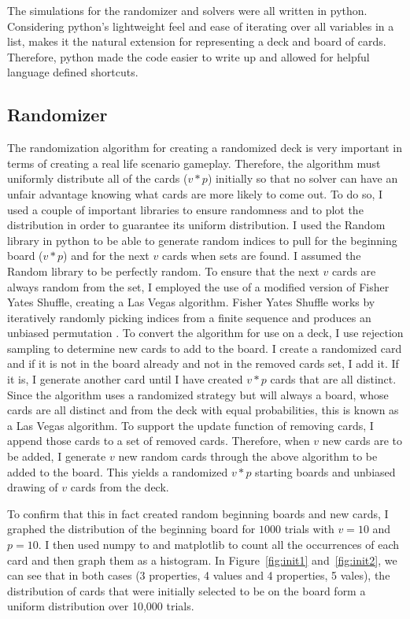\documentclass[pageno]{jpaper}
\begin{document}
The simulations for the randomizer and solvers were all written in python. Considering python's lightweight feel and ease of iterating over all variables in a list, makes it the natural extension for representing a deck and board of cards. Therefore, python made the code easier to write up and allowed for helpful language defined shortcuts. 


\subsection{Randomizer}

The randomization algorithm for creating a randomized deck is very important in terms of creating a real life scenario gameplay. Therefore, the algorithm must uniformly distribute all of the cards ($v*p$) initially so that no solver can have an unfair advantage knowing what cards are more likely to come out. To do so, I used a couple of important libraries to ensure randomness and to plot the distribution in order to guarantee its uniform distribution. I used the Random library in python to be able to generate random indices to pull for the beginning board ($v*p$) and for the next $v$ cards when sets are found. I assumed the Random library to be perfectly random. To ensure that the next $v$ cards are always random from the set, I employed the use of a modified version of Fisher Yates Shuffle, creating a Las Vegas algorithm. Fisher Yates Shuffle works by iteratively randomly picking indices from a finite sequence and produces an unbiased permutation \cite{fisher}. To convert the algorithm for use on a deck, I use rejection sampling to determine new cards to add to the board. I create a randomized card and if it is not in the board already and not in the removed cards set, I add it. If it is, I generate another card until I have created $v*p$ cards that are all distinct. Since the algorithm uses a randomized strategy but will always a board, whose cards are all distinct and from the deck with equal probabilities, this is known as a Las Vegas algorithm. To support the update function of removing cards, I append those cards to a set of removed cards. Therefore, when $v$ new cards are to be added, I generate $v$ new random cards through the above algorithm to be added to the board. This yields a randomized $v*p$ starting boards and unbiased drawing of $v$ cards from the deck.

To confirm that this in fact created random beginning boards and new cards, I graphed the distribution of the beginning board for $1000$ trials with $v = 10$ and $p = 10$. I then used numpy to and matplotlib to count all the occurrences of each card and then graph them as a histogram. In Figure~\ref{fig:init1}  and~\ref{fig:init2}, we can see that in both cases (3 properties, 4 values and 4 properties, 5 vales), the distribution of cards that were initially selected to be on the board form a uniform distribution over 10,000 trials.
\end{document}
